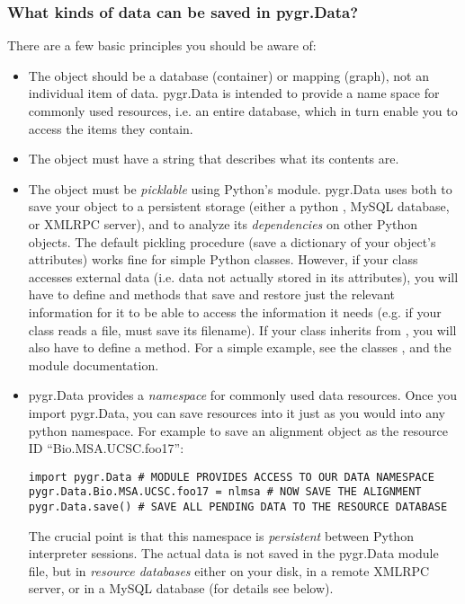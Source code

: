 \documentclass{howto}
\begin{document}
\subsubsection{What kinds of data can be saved in pygr.Data?}
There are a few basic principles you should be aware of:
\begin{itemize}
\item The object should be a database (container) or mapping (graph),
not an individual item of data.  pygr.Data is intended to provide
a name space for commonly used resources, i.e. an entire database,
which in turn enable you to access the items they contain.

\item The object must have a  string that describes
what its contents are.

\item The object must be {\em picklable} using Python's 
module.  pygr.Data uses  both to save your object to 
a persistent storage (either a python , MySQL database,
or XMLRPC server), and to analyze its {\em dependencies} on other
Python objects.  The default pickling procedure (save a dictionary of
your object's attributes) works fine for simple Python classes.
However, if your class accesses external data (i.e. data not actually
stored in its attributes), you will have to define 
and  methods that save and restore just the 
relevant information for it to be able to access the information
it needs (e.g. if your class reads a file,  must
save its filename).  If your class inherits from , you
will also have to define a  method.  For a simple
example, see the classes , and the  module documentation.

\item pygr.Data provides a {\em namespace} for commonly used data resources.
Once you import pygr.Data, you can save resources into it just as you would into
any python namespace.  For example to save an alignment object 
as the resource ID ``Bio.MSA.UCSC.foo17'':
\begin{verbatim}
import pygr.Data # MODULE PROVIDES ACCESS TO OUR DATA NAMESPACE
pygr.Data.Bio.MSA.UCSC.foo17 = nlmsa # NOW SAVE THE ALIGNMENT
pygr.Data.save() # SAVE ALL PENDING DATA TO THE RESOURCE DATABASE
\end{verbatim}
The crucial point is that this namespace is {\em persistent} between
Python interpreter sessions.  The actual data is not saved in the pygr.Data 
module file, but in {\em resource databases} either on your disk, in
a remote XMLRPC server, or in a MySQL database (for details see below).


\end{itemize}
\end{document}
